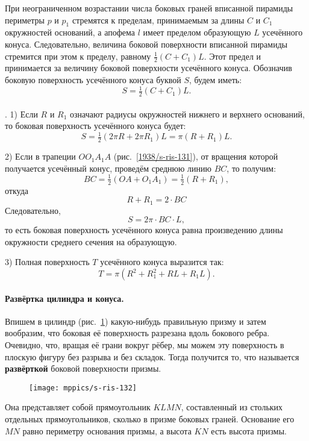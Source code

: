 При неограниченном возрастании числа боковых граней вписанной пирамиды периметры $p$ и $p_1$ стремятся к пределам, принимаемым за длины $C$ и $C_1$ окружностей оснований, а апофема $l$ имеет пределом образующую $L$ усечённого конуса.
Следовательно, величина боковой поверхности вписанной пирамиды стремится при этом к пределу, равному $\tfrac12(C + C_1)L$.
Этот предел и принимается за величину боковой поверхности усечённого конуса.
Обозначив боковую поверхность усечённого конуса буквой $S$, будем иметь:
\[S=\tfrac12 (C+C_1)L.\]

\paragraph{}\label{1938/s117}
. 1) Если $R$ и $R_1$ означают радиусы окружностей нижнего и верхнего оснований, то боковая поверхность усечённого конуса будет:
\[S = \tfrac12(2\pi R + 2\pi R_1)L = \pi (R + R_1)L.\]

2) Если в трапеции $OO_1A_1A$ (рис.~\ref{1938/s-ris-131}), от вращения которой получается усечённый конус, проведём среднюю линию $BC$, то получим:
\[BC = \tfrac12(OA + O_1A_1) = \tfrac12(R + R_1),\]
откуда
\[R + R_1=2\cdot BC\]
Следовательно,
\[S = 2\pi\cdot BC\cdot L,\]
то есть боковая поверхность усечённого конуса равна произведению длины окружности среднего сечения на образующую.

3) Полная поверхность $T$ усечённого конуса выразится так:
\[T = \pi (R^2 + R_1^2 + RL + R_1L).\]

\paragraph{Развёртка цилиндра и конуса.}\label{1938/s118}
Впишем в цилиндр (рис.~\ref{1938/s-ris-132}) какую-нибудь правильную призму и затем вообразим, что боковая её поверхность разрезана вдоль бокового ребра.
Очевидно, что, вращая её грани вокруг рёбер, мы можем  эту поверхность в плоскую фигуру без разрыва и без складок.
Тогда получится то, что называется \textbf{развёрткой} боковой поверхности призмы.
\begin{figure}[h!]
\vskip-0mm
\centering
\texttt{[image: mppics/s-ris-132]}
\caption{}\label{1938/s-ris-132}
\vskip-0mm
\end{figure}
Она представляет собой прямоугольник $KLMN$, составленный из стольких отдельных прямоугольников, сколько в призме боковых граней.
Основание его $MN$ равно периметру основания призмы, а высота $KN$ есть высота призмы.

